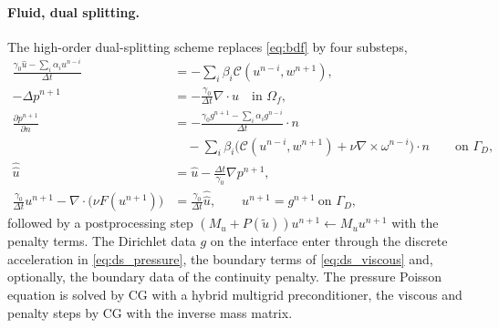 \documentclass[11pt,a4paper]{article}
\theoremstyle{definition}
\theoremstyle{remark}
\newcommand{\G}{\Gamma}
\begin{document}
\paragraph{Fluid, dual splitting.} The high-order dual-splitting scheme replaces \eqref{eq:bdf} by
four substeps,
\begin{align}
  \frac{\gamma_0\hat u-\sum_i\alpha_iu^{n-i}}{\Delta t}&=-\sum_i\beta_i\mathcal C(u^{n-i},w^{n+1}),
  \label{eq:ds_conv}\\
  -\Delta p^{n+1}&=-\frac{\gamma_0}{\Delta t}\nabla\cdot\hat u\quad\text{in }\Omega_f,\label{eq:ds_pressure}\\
  \frac{\partial p^{n+1}}{\partial n}&=-\frac{\gamma_0g^{n+1}-\sum_i\alpha_ig^{n-i}}{\Delta t}\cdot n
  \nonumber\\
  &\quad-\sum_i\beta_i\big(\mathcal C(u^{n-i},w^{n+1})+\nu\nabla\times\omega^{n-i}\big)\cdot n
  \qquad\text{on }\G_D,\nonumber\\
  \hat{\hat u}&=\hat u-\frac{\Delta t}{\gamma_0}\nabla p^{n+1},\label{eq:ds_projection}\\
  \frac{\gamma_0}{\Delta t}u^{n+1}-\nabla\cdot\big(\nu F(u^{n+1})\big)
  &=\frac{\gamma_0}{\Delta t}\hat{\hat u},\qquad u^{n+1}=g^{n+1}\ \text{on }\G_D,\label{eq:ds_viscous}
\end{align}
followed by a postprocessing step $(M_u+P(\tilde u))u^{n+1}\leftarrow M_uu^{n+1}$ with the penalty
terms. The Dirichlet data $g$ on the interface enter through the discrete acceleration in
\eqref{eq:ds_pressure}, the boundary terms of \eqref{eq:ds_viscous} and, optionally, the boundary
data of the continuity penalty. The pressure Poisson equation is solved by CG with a hybrid
multigrid preconditioner, the viscous and penalty steps by CG with the inverse mass matrix.
\end{document}
